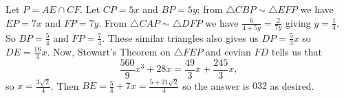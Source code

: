 Let $P=AE\cap CF$. Let $CP=5x$ and $BP=5y$; from $\triangle{CBP}\sim\triangle{EFP}$ we have $EP=7x$ and $FP=7y$. From $\triangle{CAP}\sim\triangle{DFP}$ we have $\frac{6}{4+5y}=\frac{2}{7y}$ giving $y=\frac{1}{4}$. So $BP=\frac{5}{4}$ and $FP=\frac{7}{4}$. These similar triangles also gives us $DP=\frac{5}{3}x$ so $DE=\frac{16}{3}x$. Now, Stewart's Theorem on $\triangle{FEP}$ and cevian $FD$ tells us that \[\frac{560}{9}x^3+28x=\frac{49}{3}x+\frac{245}{3}x,\] so $x=\frac{3\sqrt{2}}{4}$. Then $BE=\frac{5}{4}+7x=\frac{5+21\sqrt{2}}{4}$ so the answer is $\boxed{032}$ as desired.